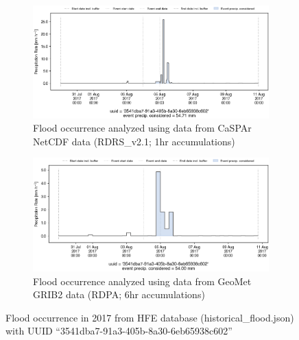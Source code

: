 \documentclass[10pt,a4paper,titlepage,parskip]{scrartcl}
\begin{document}
\begin{figure}[h]
	\begin{subfigure}[a]{1.0\textwidth}
		\centering
		\includegraphics[width=\linewidth]{figures/compare_Geomet_CaSPAr/interpolated_at_stations_occurrence_1303_identified-timesteps_RDRS_v2.1.png}
		\caption{Flood occurrence analyzed using data from CaSPAr NetCDF data (RDRS\_v2.1; 1hr accumulations)}
	\end{subfigure}
	\par\bigskip\bigskip
	\begin{subfigure}[b]{1.0\textwidth}
		\centering
		\includegraphics[width=\linewidth]{figures/compare_Geomet_CaSPAr/interpolated_at_stations_occurrence_1303_identified-timesteps_rdpa_10km_6f.png}
		\caption{Flood occurrence analyzed using data from GeoMet GRIB2 data (RDPA; 6hr accumulations)}
	\end{subfigure}
	\par\bigskip\bigskip
	\caption{Flood occurrence in 2017 from HFE database (historical\_flood.json) with UUID ``3541dba7-91a3-405b-8a30-6eb65938c602''}
\end{figure}
\pagebreak
\end{document}
